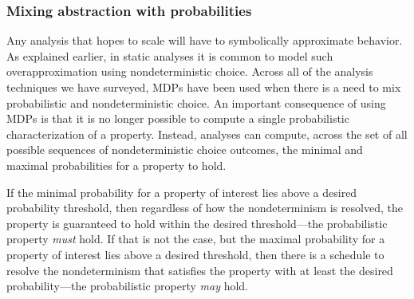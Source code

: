 \subsubsection{Mixing abstraction with probabilities}
Any analysis that hopes to scale will have to symbolically approximate
behavior.  As explained earlier, in static analyses it is common
to model such overapproximation using nondeterministic choice.
Across all of the analysis techniques we have surveyed, MDPs
have been used when there is a need to mix probabilistic
and nondeterministic choice.   
An important consequence of using MDPs is that it is no longer possible
to compute a single probabilistic characterization of a property.
Instead, analyses can compute, across the set of all possible sequences
of nondeterministic choice outcomes, the minimal and maximal 
probabilities for a property to hold.

If the minimal probability for a property of interest lies above 
a desired probability threshold, then regardless of how the nondeterminism
is resolved, the property is guaranteed to hold within the desired 
threshold---the probabilistic property \textit{must} hold.  
If that is not the case, but the maximal probability for
a property of interest lies above a desired threshold, then there
is a schedule to resolve the nondeterminism that satisfies
the property with at least the desired probability---the probabilistic property \textit{may} hold.

